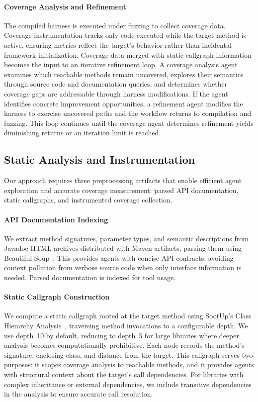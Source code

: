 \paragraph{Coverage Analysis and Refinement}
The compiled harness is executed under fuzzing to collect coverage data. Coverage instrumentation tracks only code executed while the target method is active, ensuring metrics reflect the target's behavior rather than incidental framework initialization. Coverage data merged with static callgraph information becomes the input to an iterative refinement loop. A coverage analysis agent examines which reachable methods remain uncovered, explores their semantics through source code and documentation queries, and determines whether coverage gaps are addressable through harness modifications. If the agent identifies concrete improvement opportunities, a refinement agent modifies the harness to exercise uncovered paths and the workflow returns to compilation and fuzzing. This loop continues until the coverage agent determines refinement yields diminishing returns or an iteration limit is reached.
\subsection{Static Analysis and Instrumentation}%
\label{subsec:static-analysis}

Our approach requires three preprocessing artifacts that enable efficient agent exploration and accurate coverage measurement: parsed API documentation, static callgraphs, and instrumented coverage collection.

\paragraph{API Documentation Indexing}
We extract method signatures, parameter types, and semantic descriptions from Javadoc HTML archives distributed with Maven artifacts, parsing them using Beautiful Soup~\cite{beautifulsoup}. This provides agents with concise API contracts, avoiding context pollution from verbose source code when only interface information is needed. Parsed documentation is indexed for tool usage.

\paragraph{Static Callgraph Construction}
We compute a static callgraph rooted at the target method using SootUp's Class Hierarchy Analysis~\cite{sootup2023}, traversing method invocations to a configurable depth. We use depth~10 by default, reducing to depth~5 for large libraries where deeper analysis becomes computationally prohibitive. Each node records the method's signature, enclosing class, and distance from the target. This callgraph serves two purposes: it scopes coverage analysis to reachable methods, and it provides agents with structural context about the target's call dependencies. For libraries with complex inheritance or external dependencies, we include transitive dependencies in the analysis to ensure accurate call resolution.


